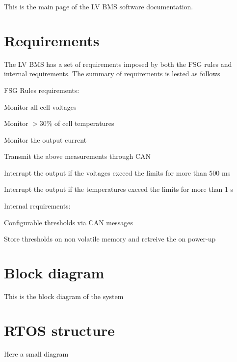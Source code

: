 This is the main page of the LV B\+MS software documentation.\hypertarget{index_requirements}{}\section{Requirements}\label{index_requirements}
The LV B\+MS has a set of requirements imposed by both the F\+SG rules and internal requirements. The summary of requirements is lested as follows

F\+SG Rules requirements\+: \begin{DoxyItemize}
\item Monitor all cell voltages \item Monitor $>$30\% of cell temperatures \item Monitor the output current \item Transmit the above measurements through C\+AN \item Interrupt the output if the voltages exceed the limits for more than 500 ms \item Interrupt the output if the temperatures exceed the limits for more than 1 s\end{DoxyItemize}
Internal requirements\+: \begin{DoxyItemize}
\item Configurable thresholds via C\+AN messages \item Store thresholds on non volatile memory and retreive the on power-\/up\end{DoxyItemize}
\hypertarget{index_bloc_diagram}{}\section{Block diagram}\label{index_bloc_diagram}
This is the block diagram of the system\hypertarget{index_rtos}{}\section{R\+T\+O\+S structure}\label{index_rtos}
Here a small diagram

